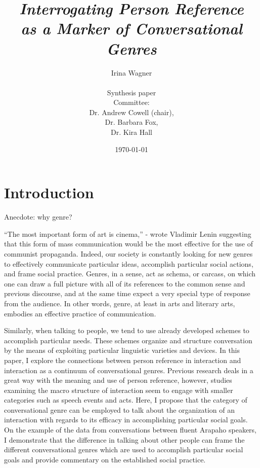 \documentclass[12pt]{turabian-researchpaper}
\title{\textit{Interrogating Person Reference \\ as a Marker of Conversational Genres
}}
\author{Irina Wagner\\ \\ Synthesis paper \\ Committee: \\ Dr. Andrew Cowell (chair), \\ Dr. Barbara Fox, \\ Dr. Kira Hall}
\date{\today}
\begin{document}
\begin{titlingpage}
\setlength{\droptitle}{80pt}

\maketitle
\setwordcount

\end{titlingpage}

 
\doublespacing
\indent

\section{Introduction}
Anecdote: why genre?

``The most important form of art is cinema,'' - wrote Vladimir Lenin suggesting that this form of mass communication would be the most effective for the use of communist propaganda. Indeed, our society is constantly looking for new genres to effectively communicate particular ideas, accomplish particular social actions, and frame social practice. Genres, in a sense, act as schema, or carcass, on which one can draw a full picture with all of its references to the common sense and previous discourse, and at the same time expect a very special type of response from the audience. In other words, genre, at least in arts and literary arts, embodies an effective practice of communication.

Similarly, when talking to people, we tend to use already developed schemes to accomplish particular needs. These schemes organize and structure conversation by the means of exploiting particular linguistic varieties and devices. In this paper, I explore the connections  between person reference in interaction and interaction as a continuum of conversational genres. Previous research deals in a great way with the meaning and use of person reference, however, studies examining the macro structure of interaction seem to engage with smaller categories such as speech events and acts. Here, I propose that the category of conversational genre can be employed to talk about the organization of an interaction with regards to its efficacy in accomplishing particular social goals. On the example of the data from conversations between fluent Arapaho speakers, I demonstrate that the difference in talking about other people can frame the different conversational genres which are used to accomplish particular social goals and provide commentary on the established social practice.
\end{document}
